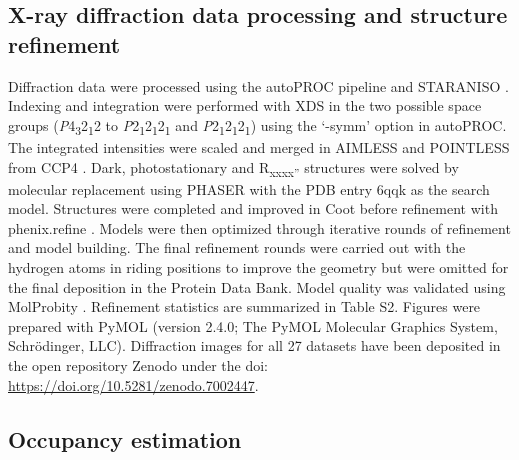 \subsection{X-ray diffraction data processing and structure refinement}
Diffraction data were processed using the autoPROC pipeline \parencite{vonrheinAdvancesAutomatedData2018} and STARANISO \parencite{tickleSTARANISO2018}. Indexing and integration were performed with XDS \parencite{kabschXDS2010} in the two possible space groups (\textit{P}4\textsubscript{3}2\textsubscript{1}2 to \textit{P}2\textsubscript{1}2\textsubscript{1}2\textsubscript{1} and \textit{P}2\textsubscript{1}2\textsubscript{1}2\textsubscript{1}) using the ‘-symm’ option in autoPROC. The integrated intensities were scaled and merged in AIMLESS \parencite{evansHowGoodAre2013} and POINTLESS \parencite{evansIntroductionDataReduction2011} from CCP4 \parencite{winnOverviewCCP4Suite2011}. Dark, photostationary and R\textsubscript{xxxx''} structures were solved by molecular replacement using PHASER with the PDB entry 6qqk \parencite{gotthardSpecificRadiationDamage2019} as the search model. Structures were completed and improved in Coot \parencite{emsleyFeaturesDevelopmentCoot2010} before refinement with phenix.refine \parencite{liebschnerMacromolecularStructureDetermination2019}. Models were then optimized through iterative rounds of refinement and model building. The final refinement rounds were carried out with the hydrogen atoms in riding positions to improve the geometry but were omitted for the final deposition in the Protein Data Bank. Model quality was validated using MolProbity \parencite{chenMolProbityAllatomStructure2010}. Refinement statistics are summarized in Table S2. Figures were prepared with PyMOL (version 2.4.0; The PyMOL Molecular Graphics System, Schrödinger, LLC). Diffraction images for all 27 datasets have been deposited in the open repository Zenodo under the doi: \href{https://doi.org/10.5281/zenodo.7002447}{https://doi.org/10.5281/zenodo.7002447}.
\subsection{Occupancy estimation}\label{sec:LOV2_slow_occupancy}

